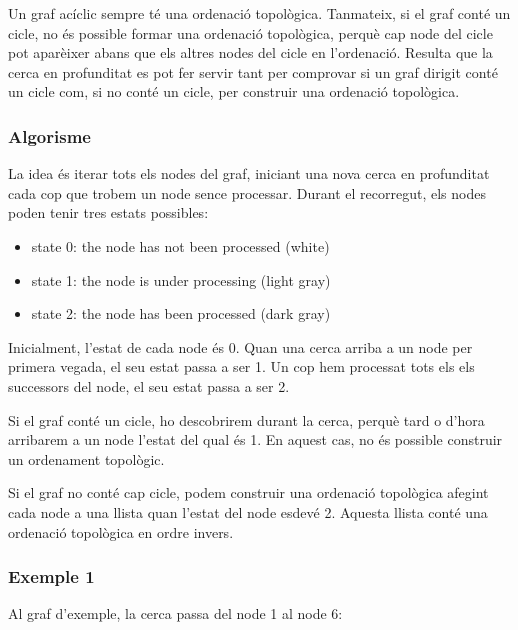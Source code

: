 Un graf acíclic sempre té una ordenació topològica. Tanmateix, si el
graf conté un cicle, no és possible formar una ordenació topològica,
perquè cap node del cicle pot aparèixer abans que els altres nodes del
cicle en l'ordenació. Resulta que la cerca en profunditat es pot
fer servir tant per comprovar si un graf dirigit conté un cicle com, si
no conté un cicle, per construir una ordenació topològica.

\subsubsection{Algorisme}

La idea és iterar tots els nodes del graf, iniciant una nova cerca en
profunditat cada cop que trobem un node sence processar. Durant el
recorregut, els nodes poden tenir tres estats possibles:


\begin{itemize}
\item state 0: the node has not been processed (white)
\item state 1: the node is under processing (light gray)
\item state 2: the node has been processed (dark gray)
\end{itemize}


Inicialment, l'estat de cada node és 0. Quan una cerca arriba a un
node per primera vegada, el seu estat passa a ser 1. Un cop hem
processat tots els els successors del node, el seu estat passa a ser
2.

Si el graf conté un cicle, ho descobrirem durant la cerca, perquè tard
o d'hora arribarem a un node l'estat del qual és 1. En aquest cas, no
és possible construir un ordenament topològic.

Si el graf no conté cap cicle, podem construir una ordenació
topològica afegint cada node a una llista quan l'estat del node esdevé
2. Aquesta llista conté una ordenació topològica en ordre invers.

\subsubsection{Exemple 1}

Al graf d'exemple, la cerca passa del node 1 al node 6:


\begin{center}
\end{center}


